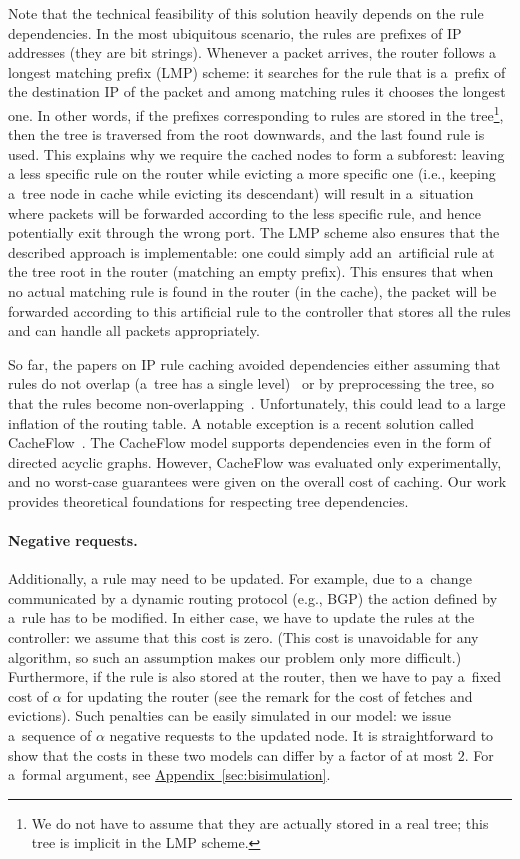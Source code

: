 \documentclass[sigconf,screen=true]{acmart}
\newcommand{\lref}[2][]{\hyperref[#2]{#1~\ref*{#2}}}
\begin{document}
Note that the technical feasibility of this solution heavily depends on the
rule dependencies. In the most ubiquitous scenario, the rules are prefixes of
IP addresses (they are bit strings). Whenever a packet arrives, the router
follows a longest matching prefix (LMP) scheme: it searches for the rule that
is a~prefix of the destination IP of the packet and among matching rules it
chooses the longest one. In other words, if the prefixes corresponding to
rules are stored in the tree\footnote{We do not have to assume that they are
actually stored in a real tree; this tree is implicit in the LMP scheme.},
then the tree is traversed from the root downwards, and the last found rule is
used. This explains why we require the cached nodes to form a subforest:
leaving a less specific rule on the router while evicting a more specific one
(i.e., keeping a~tree node in cache while evicting its descendant) will result
in a~situation where packets will be forwarded according to the less specific
rule, and hence potentially exit through the wrong port. The LMP scheme also
ensures that the described approach is implementable: one could simply add
an~artificial rule at the tree root in the router (matching an empty prefix).
This ensures that when no actual matching rule is found in the router (in the
cache), the packet will be forwarded according to this artificial rule to the
controller that stores all the rules and can handle all packets appropriately.

So far, the papers on IP rule caching avoided dependencies either assuming
that rules do not overlap (a~tree has a single level)~\cite{route-caching-flat} 
or by preprocessing the tree, so that the rules become
non-overlapping~\cite{prefix-caching,fib-caching-non-overlapping}.
Unfortunately, this could lead to a large inflation of the routing table. A
notable exception is a recent solution called CacheFlow~\cite{cacheflow}. The
CacheFlow model supports dependencies even in the form of directed acyclic
graphs. However, CacheFlow was evaluated only experimentally, and no
worst-case guarantees were given on the overall cost of caching. Our work
provides theoretical foundations for respecting tree dependencies.

\paragraph{Negative requests.}

Additionally, a rule may need to be updated. For example, due to a~change
communicated by a dynamic routing protocol (e.g., BGP) the action defined by
a~rule has to be modified. In either case, we have to update the rules at the
controller: we assume that this cost is zero. (This cost is unavoidable for
any algorithm, so such an assumption makes our problem only more difficult.)
Furthermore, if the rule is also stored at the router, then we have to pay a~fixed
cost of $\alpha$ for updating the router (see the remark for the cost of
fetches and evictions). Such penalties can be easily simulated in our model:
we issue a~sequence of $\alpha$ negative requests to the updated node.  It is
straightforward to show that the costs in these two models can differ by a
factor of at most $2$. For a~formal argument, see
\lref[Appendix]{sec:bisimulation}.
\end{document}
